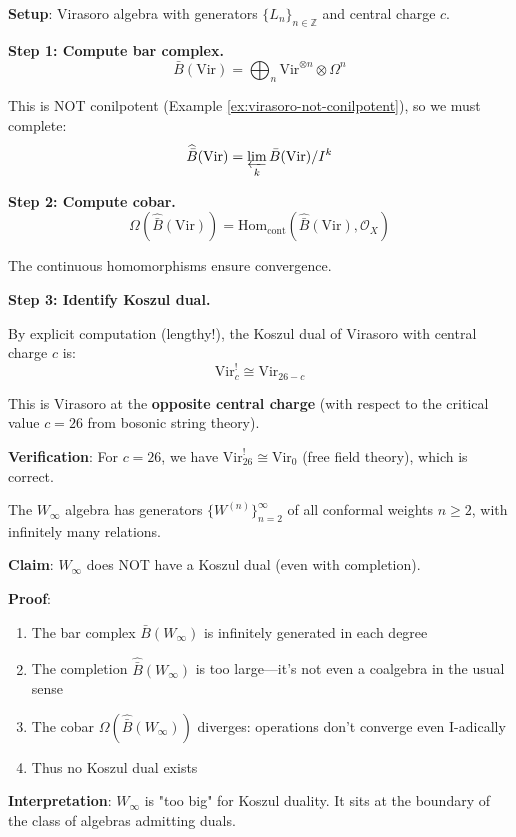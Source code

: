 \begin{example}
\label{ex:virasoro-koszul-dual}

\textbf{Setup}: Virasoro algebra with generators $\{L_n\}_{n \in \mathbb{Z}}$ and 
central charge $c$.

\textbf{Step 1: Compute bar complex.}
\begin{equation}
\bar{B}(\text{Vir}) = \bigoplus_n \text{Vir}^{\otimes n} \otimes \Omega^n
\end{equation}

This is NOT conilpotent (Example \ref{ex:virasoro-not-conilpotent}), so we must complete:
\begin{equation}
\widehat{\bar{B}}(\text{Vir}) = \varprojlim_k \bar{B}(\text{Vir}) / I^k
\end{equation}

\textbf{Step 2: Compute cobar.}
\begin{equation}
\Omega(\widehat{\bar{B}}(\text{Vir})) = \text{Hom}_{\text{cont}}(\widehat{\bar{B}}(
\text{Vir}), \mathcal{O}_X)
\end{equation}

The continuous homomorphisms ensure convergence.

\textbf{Step 3: Identify Koszul dual.}

By explicit computation (lengthy!), the Koszul dual of Virasoro with central charge $c$ is:
\begin{equation}
\text{Vir}_c^! \cong \text{Vir}_{26-c}
\end{equation}

This is Virasoro at the \textbf{opposite central charge} (with respect to the critical 
value $c=26$ from bosonic string theory).

\textbf{Verification}: For $c=26$, we have $\text{Vir}_{26}^! \cong \text{Vir}_0$ (free 
field theory), which is correct.
\end{example}

\begin{example}
\label{ex:winfty-no-dual}

The $W_\infty$ algebra has generators $\{W^{(n)}\}_{n=2}^\infty$ of all conformal weights 
$n \geq 2$, with infinitely many relations.

\textbf{Claim}: $W_\infty$ does NOT have a Koszul dual (even with completion).

\textbf{Proof}: 
\begin{enumerate}
\item The bar complex $\bar{B}(W_\infty)$ is infinitely generated in each degree
\item The completion $\widehat{\bar{B}}(W_\infty)$ is too large---it's not even a 
coalgebra in the usual sense
\item The cobar $\Omega(\widehat{\bar{B}}(W_\infty))$ diverges: operations don't 
converge even I-adically
\item Thus no Koszul dual exists
\end{enumerate}

\textbf{Interpretation}: $W_\infty$ is "too big" for Koszul duality. It sits at the 
boundary of the class of algebras admitting duals.
\end{example}

